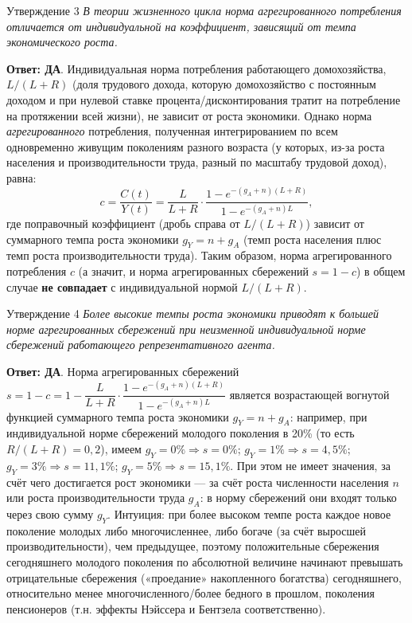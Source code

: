 \documentclass[10pt,a4paper]{article}
\newcommand{\qda}{\textbf{\color{yesgreen}Ответ: ДА}}
\newenvironment{answer}[2]{%
  \begin{qbox}{Утверждение #1}
  \textit{#2}\par\smallskip
}{%
  \end{qbox}\vspace{2pt}
}
\begin{document}
\begin{answer}{3}{В теории жизненного цикла норма агрегированного потребления отличается от индивидуальной на коэффициент, зависящий от темпа экономического роста.}
\qda. Индивидуальная норма потребления работающего домохозяйства, $L/(L+R)$ (доля трудового дохода, которую домохозяйство с постоянным доходом и при нулевой ставке процента/дисконтирования тратит на потребление на протяжении всей жизни), не зависит от роста экономики. Однако норма \emph{агрегированного} потребления, полученная интегрированием по всем одновременно живущим поколениям разного возраста (у которых, из-за роста населения и производительности труда, разный по масштабу трудовой доход), равна:
\[
c = \frac{C(t)}{Y(t)} = \frac{L}{L+R}\cdot\frac{1-e^{-(g_A+n)(L+R)}}{1-e^{-(g_A+n)L}},
\]
где поправочный коэффициент (дробь справа от $L/(L+R)$) зависит от суммарного темпа роста экономики $g_Y=n+g_A$ (темп роста населения плюс темп роста производительности труда). Таким образом, норма агрегированного потребления $c$ (а значит, и норма агрегированных сбережений $s=1-c$) в общем случае \textbf{не совпадает} с индивидуальной нормой $L/(L+R)$.
\end{answer}
 
\begin{answer}{4}{Более высокие темпы роста экономики приводят к большей норме агрегированных сбережений при неизменной индивидуальной норме сбережений работающего репрезентативного агента.}
\qda. Норма агрегированных сбережений $s=1-c=1-\dfrac{L}{L+R}\cdot\dfrac{1-e^{-(g_A+n)(L+R)}}{1-e^{-(g_A+n)L}}$ является возрастающей вогнутой функцией суммарного темпа роста экономики $g_Y=n+g_A$: например, при индивидуальной норме сбережений молодого поколения в 20\% (то есть $R/(L+R)=0{,}2$), имеем $g_Y=0\%\Rightarrow s=0\%$; $g_Y=1\%\Rightarrow s=4{,}5\%$; $g_Y=3\%\Rightarrow s=11{,}1\%$; $g_Y=5\%\Rightarrow s=15{,}1\%$. При этом не имеет значения, за счёт чего достигается рост экономики — за счёт роста численности населения $n$ или роста производительности труда $g_A$: в норму сбережений они входят только через свою сумму $g_Y$. Интуиция: при более высоком темпе роста каждое новое поколение молодых либо многочисленнее, либо богаче (за счёт выросшей производительности), чем предыдущее, поэтому положительные сбережения сегодняшнего молодого поколения по абсолютной величине начинают превышать отрицательные сбережения («проедание» накопленного богатства) сегодняшнего, относительно менее многочисленного/более бедного в прошлом, поколения пенсионеров (т.н. эффекты Нэйссера и Бентзела соответственно).
\end{answer}
 
\end{document}

